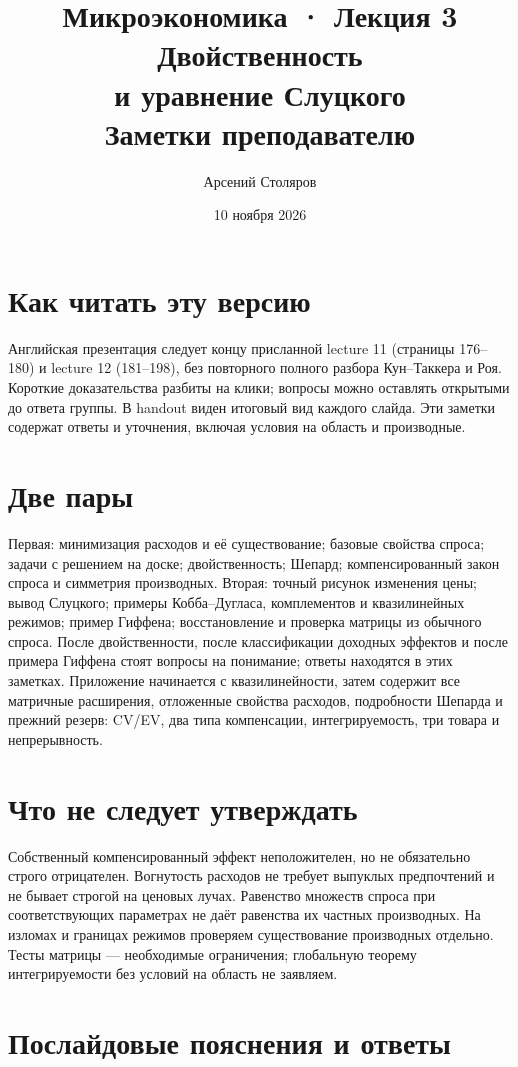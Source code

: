 \documentclass[11pt,a4paper]{article}
\title{Микроэкономика · Лекция 3\\Двойственность\\и уравнение Слуцкого\\Заметки преподавателю}
\author{Арсений Столяров}\date{10 ноября 2026}
\begin{document}
\maketitle
\section*{Как читать эту версию}
Английская презентация следует концу присланной lecture 11 (страницы 176--180) и lecture 12 (181--198), без повторного полного разбора Кун--Таккера и Роя. Короткие доказательства разбиты на клики; вопросы можно оставлять открытыми до ответа группы. В handout виден итоговый вид каждого слайда. Эти заметки содержат ответы и уточнения, включая условия на область и производные.

\section*{Две пары}
Первая: минимизация расходов и её существование; базовые свойства спроса; задачи с решением на доске; двойственность; Шепард; компенсированный закон спроса и симметрия производных. Вторая: точный рисунок изменения цены; вывод Слуцкого; примеры Кобба--Дугласа, комплементов и квазилинейных режимов; пример Гиффена; восстановление и проверка матрицы из обычного спроса. После двойственности, после классификации доходных эффектов и после примера Гиффена стоят вопросы на понимание; ответы находятся в этих заметках. Приложение начинается с квазилинейности, затем содержит все матричные расширения, отложенные свойства расходов, подробности Шепарда и прежний резерв: CV/EV, два типа компенсации, интегрируемость, три товара и непрерывность.

\section*{Что не следует утверждать}
Собственный компенсированный эффект неположителен, но не обязательно строго отрицателен. Вогнутость расходов не требует выпуклых предпочтений и не бывает строгой на ценовых лучах. Равенство множеств спроса при соответствующих параметрах не даёт равенства их частных производных. На изломах и границах режимов проверяем существование производных отдельно. Тесты матрицы — необходимые ограничения; глобальную теорему интегрируемости без условий на область не заявляем.

\section*{Послайдовые пояснения и ответы}
\end{document}
